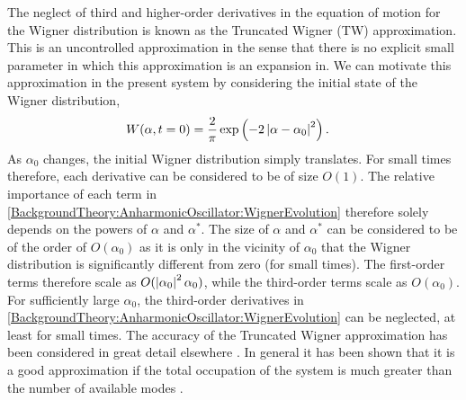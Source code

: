 The neglect of third and higher-order derivatives in the equation of motion for the Wigner distribution is known as the Truncated Wigner (TW) approximation.  This is an uncontrolled approximation in the sense that there is no explicit small parameter in which this approximation is an expansion in.  We can motivate this approximation in the present system by considering the initial state of the Wigner distribution,
\begin{align}
    W(\alpha, t=0) &= \frac{2}{\pi} \exp\left(- 2 \abs{\alpha - \alpha_0}^2\right). \label{BackgroundTheory:WignerFunctionCoherentState}
\end{align}
As $\alpha_0$ changes, the initial Wigner distribution simply translates.  For small times therefore, each derivative can be considered to be of size $O(1)$.  The relative importance of each term in \eqref{BackgroundTheory:AnharmonicOscillator:WignerEvolution} therefore solely depends on the powers of $\alpha$ and $\alpha^*$.  The size of $\alpha$ and $\alpha^*$ can be considered to be of the order of $O(\alpha_0)$ as it is only in the vicinity of $\alpha_0$ that the Wigner distribution is significantly different from zero (for small times).  The first-order terms therefore scale as $O(\left|\alpha_0\right|^2 \alpha_0)$, while the third-order terms scale as $O(\alpha_0)$.  For sufficiently large $\alpha_0$, the third-order derivatives in \eqref{BackgroundTheory:AnharmonicOscillator:WignerEvolution} can be neglected, at least for small times.  The accuracy of the Truncated Wigner approximation has been considered in great detail elsewhere \citep{Sinatra:2002lq,Norrie:2005fk,Norrie:2006vn,Norrie:2006kx,Polkovnikov:2003}.  In general it has been shown that it is a good approximation if the total occupation of the system is much greater than the number of available modes \citep{Norrie:2006vn}.  

